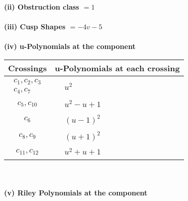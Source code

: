\documentclass[1p]{elsarticle_modified}
\theoremstyle{definition}
\begin{document}
\flushleft \textbf{(ii) Obstruction class $= 1$}\\~\\
\flushleft \textbf{(iii) Cusp Shapes $= -4 v-5$}\\~\\
\newpage\renewcommand{\arraystretch}{1}
\flushleft \textbf{(iv) u-Polynomials at the component}\newline \\
\begin{tabular}{m{50pt}|m{274pt}}
Crossings & \hspace{64pt}u-Polynomials at each crossing \\
\hline $$\begin{aligned}c_{1},c_{2},c_{3}\\c_{4},c_{7}\end{aligned}$$&$\begin{aligned}
&u^2
\end{aligned}$\\
\hline $$\begin{aligned}c_{5},c_{10}\end{aligned}$$&$\begin{aligned}
&u^2- u+1
\end{aligned}$\\
\hline $$\begin{aligned}c_{6}\end{aligned}$$&$\begin{aligned}
&(u-1)^2
\end{aligned}$\\
\hline $$\begin{aligned}c_{8},c_{9}\end{aligned}$$&$\begin{aligned}
&(u+1)^2
\end{aligned}$\\
\hline $$\begin{aligned}c_{11},c_{12}\end{aligned}$$&$\begin{aligned}
&u^2+u+1
\end{aligned}$\\
\hline
\end{tabular}\\~\\
\newpage\renewcommand{\arraystretch}{1}
\flushleft \textbf{(v) Riley Polynomials at the component}\newline \\
\end{document}
